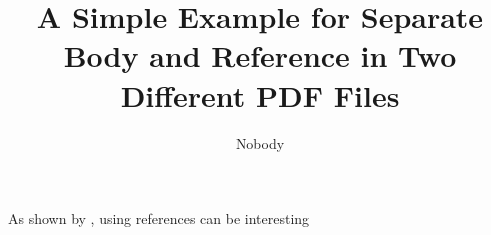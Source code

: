 \documentclass{article}
\title{A Simple Example for Separate Body and Reference in Two Different PDF Files}
\author{Nobody}
\begin{document}
\maketitle

As shown by \citet{author}, using references can be interesting

\newpage

\newpage
\AtBeginShipout{%
\AtBeginShipoutDiscard
}
    


\end{document}
